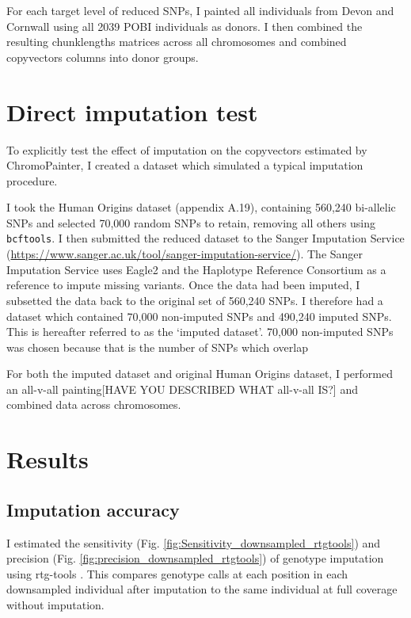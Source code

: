 For each target level of reduced SNPs, I painted all individuals from Devon and Cornwall using all 2039 POBI individuals as donors. I then combined the resulting chunklengths matrices across all chromosomes and combined copyvectors columns into donor groups.

\section{Direct imputation test}

To explicitly test the effect of imputation on the copyvectors estimated by ChromoPainter, I created a dataset which simulated a typical imputation procedure. 

I took the Human Origins dataset (appendix A.19), containing 560,240 bi-allelic SNPs and selected 70,000 random SNPs to retain, removing all others using \texttt{bcftools}. I then submitted the reduced dataset to the Sanger Imputation Service (\url{https://www.sanger.ac.uk/tool/sanger-imputation-service/}). The Sanger Imputation Service uses Eagle2 \cite{loh2016reference} and the Haplotype Reference Consortium as a reference to impute missing variants. Once the data had been imputed, I subsetted the data back to the original set of 560,240 SNPs. I therefore had a dataset which contained 70,000 non-imputed SNPs and 490,240 imputed SNPs. This is hereafter referred to as the `imputed dataset'. 70,000 non-imputed SNPs was chosen because that is the number of SNPs which overlap

For both the imputed dataset and original Human Origins dataset, I performed an all-v-all painting{\color{red}[HAVE YOU DESCRIBED WHAT all-v-all IS?]} and combined data across chromosomes. 


\section{Results}

\subsection{Imputation accuracy}

I estimated the sensitivity (Fig. \ref{fig:Sensitivity_downsampled_rtgtools}) and precision (Fig.  \ref{fig:precision_downsampled_rtgtools}) of genotype imputation using rtg-tools \cite{cleary2014joint}. This compares genotype calls at each position in each downsampled individual after imputation to the same individual at full coverage without imputation.

